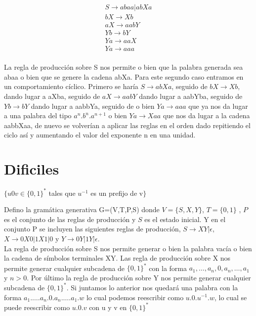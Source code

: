 \documentclass[a4paper,11pt]{article}
\begin{document}
\begin{align*}
S\rightarrow abaa |abXa \\
bX \rightarrow Xb \\
aX \rightarrow aabY \\
Yb \rightarrow bY \\
Ya \rightarrow aaX \\
Ya \rightarrow aaa \\
\end{align*}

La regla de producción sobre S nos permite o bien que la palabra generada sea abaa o bien que se genere la cadena abXa. Para este segundo caso entramos en un comportamiento cíclico. Primero se haría $S \rightarrow abXa$, seguido de $bX \rightarrow Xb$, dando lugar a aXba, seguido de $aX \rightarrow aabY$ dando lugar a aabYba, seguido de $Yb \rightarrow bY$ dando lugar a aabbYa, seguido de o bien $Ya \rightarrow aaa$ que ya nos da lugar a una palabra del tipo $a^n.b^n.a^{n+1}$ o bien $Ya \rightarrow Xaa$ que nos da lugar a la cadena aabbXaa, de nuevo se volverían a aplicar las reglas en el orden dado repitiendo el ciclo así y aumentando el valor del exponente n en una unidad.

\section{Dificiles}
$\{u0v \in \{0,1\}^*$ tales que $u^{-1}$ es un prefijo de v$\}$

Defino la gramática generativa G=(V,T,P,S) donde $V=\{S,X,Y\}$, $T=\{0,1\}$ , $P$ es el conjunto de las reglas de producción y $S$ es el estado inicial. Y en el conjunto P se incluyen las siguientes reglas de producción, $S \rightarrow XY|\epsilon$, $X \rightarrow 0X0|1X1|0$ y $Y\rightarrow 0Y|1Y|\epsilon$. \\

La regla de producción sobre S nos permite generar o bien la palabra vacía o bien la cadena de símbolos terminales XY. Las regla de producción sobre X nos permite generar cualquier subcadena de $\{0,1\}^*$ con la forma $a_1,\ldots,a_n,0,a_n,\ldots,a_1$ y $n > 0$. Por último la regla de producción sobre Y nos permite generar cualquier subcadena de $\{0,1\}^*$. Si juntamos lo anterior nos quedará una palabra con la forma $a_1.\ldots.a_n.0.a_n.\ldots.a_1.w$ lo cual podemos reescribir como $u.0.u^{-1}.w$, lo cual se puede reescribir como $u.0.v$ con u y v en $\{0,1\}^*$
\end{document}
